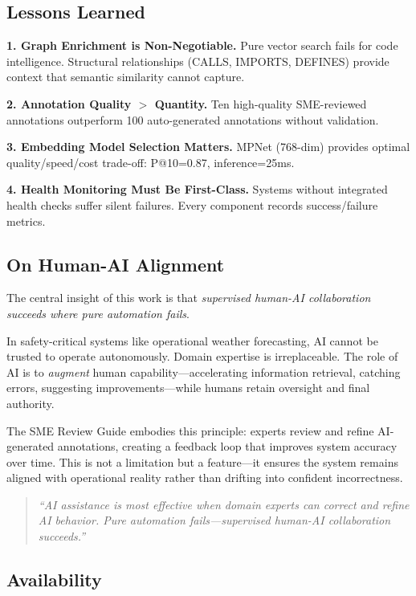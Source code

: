 \documentclass[11pt,letterpaper]{article}
\begin{document}
\subsection{Lessons Learned}

\textbf{1. Graph Enrichment is Non-Negotiable.} Pure vector search fails for code intelligence. Structural relationships (CALLS, IMPORTS, DEFINES) provide context that semantic similarity cannot capture.

\textbf{2. Annotation Quality $>$ Quantity.} Ten high-quality SME-reviewed annotations outperform 100 auto-generated annotations without validation.

\textbf{3. Embedding Model Selection Matters.} MPNet (768-dim) provides optimal quality/speed/cost trade-off: P@10=0.87, inference=25ms.

\textbf{4. Health Monitoring Must Be First-Class.} Systems without integrated health checks suffer silent failures. Every component records success/failure metrics.

\subsection{On Human-AI Alignment}

The central insight of this work is that \textit{supervised human-AI collaboration succeeds where pure automation fails}.

In safety-critical systems like operational weather forecasting, AI cannot be trusted to operate autonomously. Domain expertise is irreplaceable. The role of AI is to \textit{augment} human capability---accelerating information retrieval, catching errors, suggesting improvements---while humans retain oversight and final authority.

The SME Review Guide embodies this principle: experts review and refine AI-generated annotations, creating a feedback loop that improves system accuracy over time. This is not a limitation but a feature---it ensures the system remains aligned with operational reality rather than drifting into confident incorrectness.

\begin{quote}
\textit{``AI assistance is most effective when domain experts can correct and refine AI behavior. Pure automation fails---supervised human-AI collaboration succeeds.''}
\end{quote}

\subsection{Availability}
\end{document}
